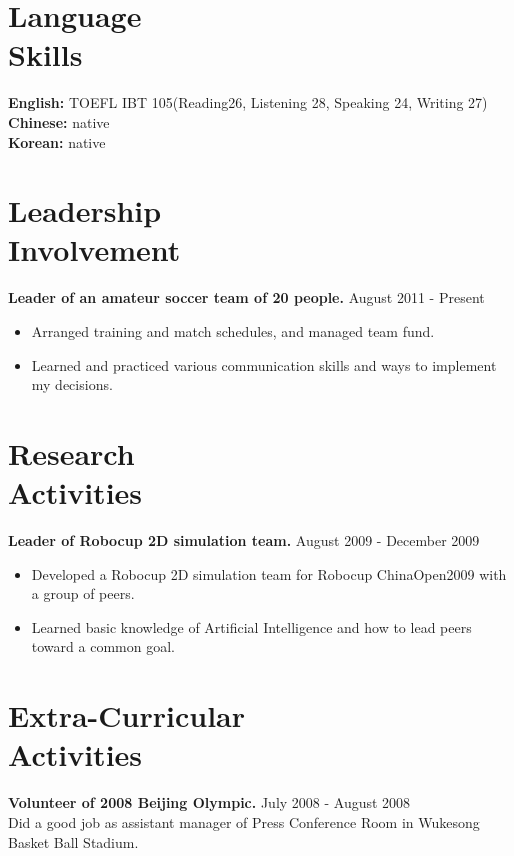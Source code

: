\documentclass[margin]{res}
\begin{document}
\begin{resume}
 \section{Language \\ Skills} 
				{\bf English:} TOEFL IBT 105(Reading26, Listening 28, Speaking 24, Writing 27)\\
				{\bf Chinese:} native \\
				{\bf Korean: } native	\\	 
 
 \section{Leadership \\ Involvement} 
				{ \bf Leader of an amateur soccer team of 20 people.} \hfill August 2011 - Present \\           
                 \begin{itemize}  \itemsep -2pt %
                 \item Arranged training and match schedules, and managed team fund. 
                \item  Learned and practiced various communication skills and ways to implement my decisions.
                \end{itemize}

\section{Research \\ Activities} 
				{ \bf Leader of Robocup 2D simulation team.} \hfill August 2009 - December 2009 \\  								
                 \begin{itemize}  \itemsep -2pt %
                 \item Developed a Robocup 2D simulation team for Robocup ChinaOpen2009 with a group of peers. 
                \item  Learned basic knowledge of Artificial Intelligence and how to lead peers toward a common goal.
                \end{itemize}

\section{Extra-Curricular \\ Activities} 
				{ \bf Volunteer of 2008 Beijing Olympic.} \hfill July 2008 - August 2008 \\  		
                 Did a good job as assistant manager of Press Conference Room in Wukesong Basket Ball Stadium.
 

\end{resume}
\end{document}
